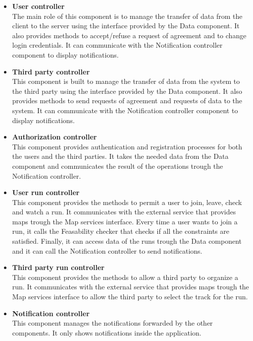 \begin{legal}
\begin{itemize}
		\item{\textbf{User controller}\\
		The main role of this component is to manage the transfer of data from the client to the server using the interface provided by the Data component. It also provides methods to accept/refuse a request of agreement and to change login credentials. It can communicate with the Notification controller component to display notifications.
				}\\
		\item{\textbf{Third party controller}\\
		This component is built to manage the transfer of data from the system to the third party using the interface provided by the Data component. It also provides methods to send requests of agreement and requests of data to the system. It can communicate with the Notification controller component to display notifications.
				}\\
		\item{\textbf{Authorization controller}\\
		This component provides authentication and registration processes for both the users and the third parties. It takes the needed data from the Data component and communicates the result of the operations trough the Notification controller.
				}\\
		\item{\textbf{User run controller}\\
		This component provides the methods to permit a user to join, leave, check and watch a run. It communicates with the external service that provides maps trough the Map services interface. Every time a user wants to join a run, it calls the Feasability checker that checks if all the constraints are satisfied. Finally, it can access data of the runs trough the Data component and it can call the Notification controller to send notifications.
				}\\
		\item{\textbf{Third party run controller}\\
		This component provides the methods to allow a third party to organize a run. It communicates with the external service that provides maps trough the Map services interface to allow the third party to select the track for the run.
				}\\				
		\item{\textbf{Notification controller}\\
		This component manages the notifications forwarded by the other components. It only shows notifications inside the application.
}
\end{itemize}
\end{legal}
